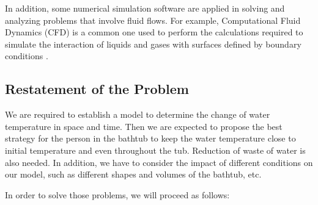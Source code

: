 In addition, some numerical simulation software are applied in solving and analyzing problems that involve fluid flows. For example, Computational Fluid Dynamics (CFD) is a common one used to perform the calculations required to simulate the interaction of liquids and gases with surfaces defined by boundary conditions \cite{4}.

\subsection{Restatement of the Problem}

We are required to establish a model to determine the change of water temperature in space and time. Then we are expected to propose the best strategy for the person in the bathtub to keep the water temperature close to initial temperature and even throughout the tub. Reduction of waste of water is also needed. In addition, we have to consider the impact of different conditions on our model, such as different shapes and volumes of the bathtub, etc.

In order to solve those problems, we will proceed as follows:

